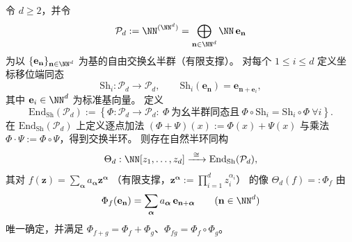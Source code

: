 \begin{theorem}\label{thm:conclusion-multishift-commuting-algorithms-polynomial}
令 \(d\ge 2\)，并令
\[
\mathcal P_d:=\NN^{(\NN^d)}=\bigoplus_{\mathbf n\in\NN^d}\NN\,\mathbf e_{\mathbf n}
\]
为以 \(\{\mathbf e_{\mathbf n}\}_{\mathbf n\in\NN^d}\) 为基的自由交换幺半群（有限支撑）。
对每个 \(1\le i\le d\) 定义坐标移位端同态
\[
\mathrm{Sh}_i:\mathcal P_d\to\mathcal P_d,
\qquad
\mathrm{Sh}_i(\mathbf e_{\mathbf n})=\mathbf e_{\mathbf n+\mathbf e_i},
\]
其中 \(\mathbf e_i\in\NN^d\) 为标准基向量。
定义
\[
\mathrm{End}_{\mathrm{Sh}}(\mathcal P_d)
:=\left\{
\Phi:\mathcal P_d\to\mathcal P_d:\ 
\Phi\ \text{为幺半群同态且}\ 
\Phi\circ\mathrm{Sh}_i=\mathrm{Sh}_i\circ\Phi\ \forall i
\right\}.
\]
在 \(\mathrm{End}_{\mathrm{Sh}}(\mathcal P_d)\) 上定义逐点加法 \((\Phi+\Psi)(x):=\Phi(x)+\Psi(x)\) 与乘法 \(\Phi\cdot\Psi:=\Phi\circ\Psi\)，得到交换半环。
则存在自然半环同构
\[
\Theta_d:\NN[z_1,\dots,z_d]\xrightarrow{\ \cong\ }\mathrm{End}_{\mathrm{Sh}}(\mathcal P_d),
\]
其对
\(
f(\mathbf z)=\sum_{\boldsymbol\alpha}a_{\boldsymbol\alpha}\mathbf z^{\boldsymbol\alpha}
\)
（有限支撑，\(\mathbf z^{\boldsymbol\alpha}:=\prod_{i=1}^d z_i^{\alpha_i}\)）
的像 \(\Theta_d(f)=:\Phi_f\) 由
\[
\Phi_f(\mathbf e_{\mathbf n})
=\sum_{\boldsymbol\alpha}a_{\boldsymbol\alpha}\,\mathbf e_{\mathbf n+\boldsymbol\alpha}
\qquad(\mathbf n\in\NN^d)
\]
唯一确定，并满足 \(\Phi_{f+g}=\Phi_f+\Phi_g\)、\(\Phi_{fg}=\Phi_f\circ\Phi_g\)。
\end{theorem}
